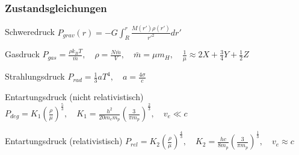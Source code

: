 \documentclass{beamer}
\begin{document}
\begin{frame}\frametitle{Zustandsgleichungen}

\tiny{

  \begin{block}{Schweredruck}
    $P_{grav}(r) = -G \displaystyle \int_R^r \frac{M(r')\rho(r')}{r'^2}dr'$
  \end{block}
  

  \begin{block}{Gasdruck}
    $P_{gas} = \frac{\rho k_B T}{\bar{m}}, \quad \rho = \frac{N \bar{m}}{V}, \quad \bar{m} = \mu m_H, \quad \frac{1}{\mu} \approx 2 X + \frac{3}{4} Y + \frac{1}{2} Z$
  \end{block}
  
  
  \begin{block}{Strahlungsdruck}
    $P_{rad} = \frac{1}{3} a T^4, \quad a = \frac{4 \sigma}{c}$
  \end{block}
  
  
  \begin{block}{Entartungsdruck (nicht relativistisch)}
    $P_{deg} = K_1 (\frac{\rho}{\mu})^{\frac{5}{3}}, \quad K_1 = \frac{h^2}{20 m_e m_p}(\frac{3}{\pi m_p})^{\frac{2}{3}}, \quad v_e \ll c$
  \end{block}
  
  
  \begin{block}{Entartungsdruck (relativistisch)}
    $P_{rel} = K_2 (\frac{\rho}{\mu})^{\frac{4}{3}}, \quad K_2 = \frac{hc}{8 m_p}(\frac{3}{\pi m_p})^{\frac{1}{3}}, \quad v_e \approx c$
  \end{block}
  
}

\end{frame}
\end{document}
